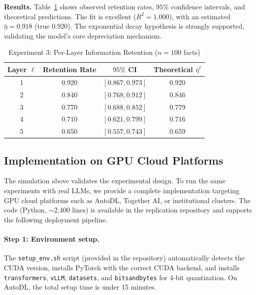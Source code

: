 \textbf{Results.} Table~\ref{tab:exp3} shows observed retention rates, $95\%$ confidence intervals, and theoretical predictions. The fit is excellent ($R^{2} = 1.000$), with an estimated $\hat{\eta} = 0.918$ (true $0.920$). The exponential decay hypothesis is strongly supported, validating the model's core depreciation mechanism.

\begin{table}[htbp]
\centering
\caption{Experiment 3: Per-Layer Information Retention ($n = 100$ facts)}
\label{tab:exp3}
\begin{tabular}{@{}cccc@{}}
\toprule
Layer $\ell$ & Retention Rate & $95\%$ CI & Theoretical $\bar{\eta}^{\ell}$ \\
\midrule
1 & 0.920 & $[0.867, 0.973]$ & 0.920 \\
2 & 0.840 & $[0.768, 0.912]$ & 0.846 \\
3 & 0.770 & $[0.688, 0.852]$ & 0.779 \\
4 & 0.710 & $[0.621, 0.799]$ & 0.716 \\
5 & 0.650 & $[0.557, 0.743]$ & 0.659 \\
\bottomrule
\end{tabular}
\end{table}

\subsection{Implementation on GPU Cloud Platforms}

The simulation above validates the experimental design. To run the same experiments with real LLMs, we provide a complete implementation targeting GPU cloud platforms such as AutoDL, Together AI, or institutional clusters. The code (Python, $\sim$2,400 lines) is available in the replication repository and supports the following deployment pipeline.

\paragraph{Step 1: Environment setup.} The \texttt{setup\_env.sh} script (provided in the repository) automatically detects the CUDA version, installs PyTorch with the correct CUDA backend, and installs \texttt{transformers}, \texttt{vLLM}, \texttt{datasets}, and \texttt{bitsandbytes} for 4-bit quantization. On AutoDL, the total setup time is under 15 minutes.

